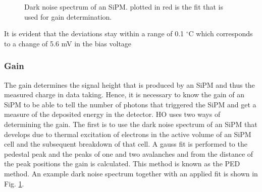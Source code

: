 \begin{figure}[h]
\begin{minipage}[t]{0.455\textwidth}
\caption{Dark noise spectrum of an SiPM. plotted in red is the fit that is used for gain determination.}
\label{darkNoise}
\end{minipage}
\end{figure}
It is evident that the deviations stay within a range of 0.1 $^\circ$C which corresponds to a change of 5.6 mV in the bias voltage

\subsubsection{Gain}
The gain determines the signal height that is produced by an SiPM and thus the measured charge in data taking. Hence, it is necessary to know the gain of an SiPM to be able to tell the number of photons that triggered the SiPM and get a measure of the deposited energy in the detector. HO uses two ways of determining the gain.
The first is to use the dark noise spectrum of an SiPM that develops due to thermal excitation of electrons in the active volume of an SiPM cell and the subsequent breakdown of that cell. A gauss fit is performed to the pedestal peak and the peaks of one and two avalanches and from the distance of the peak positions the gain is calculated. This method is known as the PED method. An example dark noise spectrum together with an applied fit is shown in Fig. \ref{darkNoise}.
